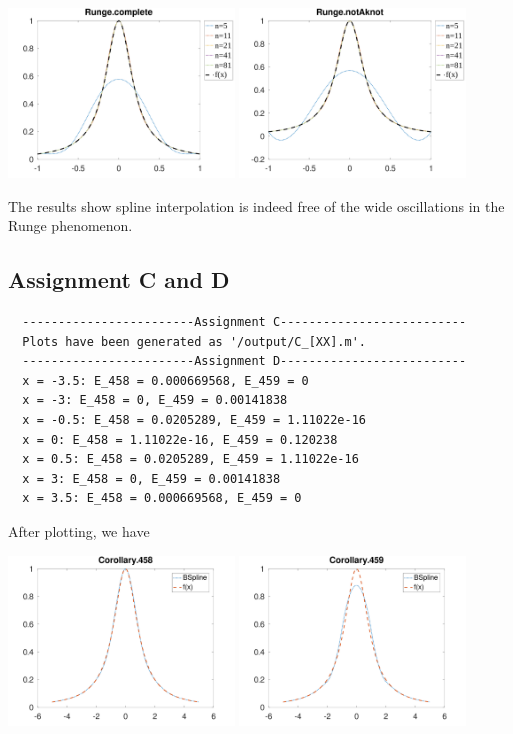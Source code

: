 \documentclass{article}
\begin{document}
\includegraphics[width=0.45\textwidth]{figures/Assignment_B_complete.png}
\includegraphics[width=0.45\textwidth]{figures/Assignment_B_notAknot.png}

The results show spline interpolation is indeed free of the wide oscillations in the Runge phenomenon.

\subsection*{\textbf{Assignment C and D}}
\lstset{language=C++}
\begin{lstlisting}
  ------------------------Assignment C--------------------------
  Plots have been generated as '/output/C_[XX].m'.
  ------------------------Assignment D--------------------------
  x = -3.5: E_458 = 0.000669568, E_459 = 0
  x = -3: E_458 = 0, E_459 = 0.00141838
  x = -0.5: E_458 = 0.0205289, E_459 = 1.11022e-16
  x = 0: E_458 = 1.11022e-16, E_459 = 0.120238
  x = 0.5: E_458 = 0.0205289, E_459 = 1.11022e-16
  x = 3: E_458 = 0, E_459 = 0.00141838
  x = 3.5: E_458 = 0.000669568, E_459 = 0
\end{lstlisting}
After plotting, we have

\includegraphics[width=0.45\textwidth]{figures/Assignment_C_458.png}
\includegraphics[width=0.45\textwidth]{figures/Assignment_C_459.png}
\end{document}
